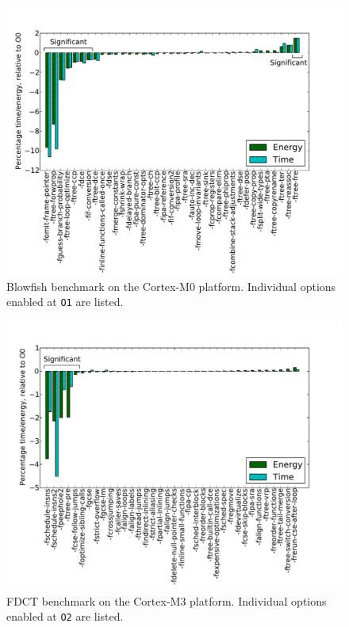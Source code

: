 \documentclass[twocolumn]{article}
\let\oldcaption\caption
\renewcommand{\caption}[1]{\oldcaption{\textup{#1}}}
\begin{document}
\begin{figure}[t!]
	\includegraphics[width=\linewidth,clip,trim=0.5cm 0 2cm 1.8cm]{cortex-m0/O1_main_effects_blowfish.pdf}
	\caption{Blowfish benchmark on the Cortex-M0 platform. Individual options enabled at \texttt{O1} are listed.}
	\label{Fig:BlowfishMainEffects}
\end{figure}

\begin{figure}[t!]
	\includegraphics[width=\linewidth,clip,trim=0.5cm 0 2cm 1.8cm]{cortex-m3/O2_main_effects_fdct.pdf}
	\caption{FDCT benchmark on the Cortex-M3 platform. Individual options enabled at \texttt{O2} are listed.}
	\label{Fig:FdctO2MainEffects}
\end{figure}
\end{document}
